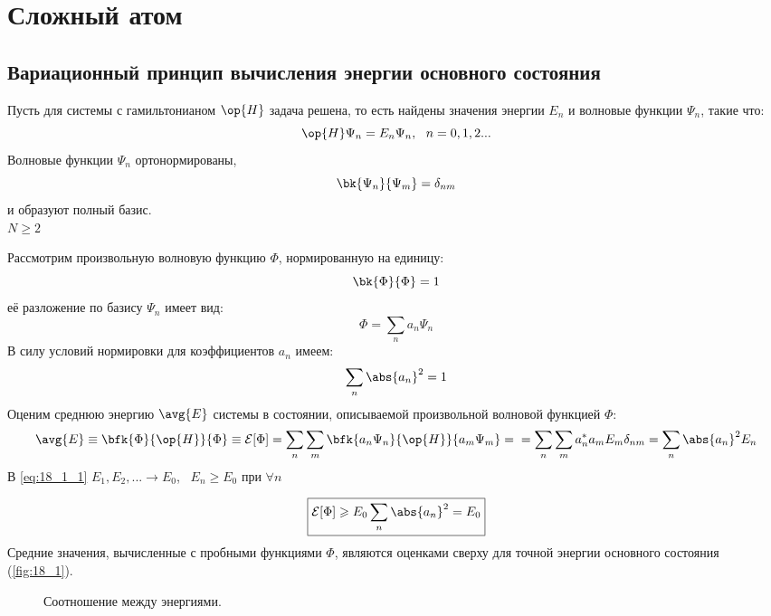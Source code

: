 \chapter{Сложный атом}

\section{Вариационный принцип вычисления энергии основного состояния}

Пусть для системы с гамильтонианом $\op{H}$ задача решена, то есть найдены значения энергии $E_n$ и волновые функции $\Psi_n$, такие что:
$$
\op{H}\Psi_n = E_n \Psi_n,~~ n = 0,1,2...
$$
Волновые функции $\Psi_n$ ортонормированы,
$$
\bk{\Psi_n}{\Psi_m} = \delta_{nm}
$$
и образуют полный базис.\\
$N \geqslant 2$

Рассмотрим произвольную волновую функцию $\Phi$, нормированную на единицу:
$$
\bk{\Phi}{\Phi} = 1
$$
её разложение по базису $\Psi_n$ имеет вид:
$$
\Phi = \sum_n a_n \Psi_n
$$
В силу условий нормировки для коэффициентов $a_n$ имеем:
$$
\sum_n \abs{a_n}^2 = 1
$$
Оценим среднюю энергию $\avg{E}$ системы в состоянии, описываемой произвольной волновой функцией $\Phi$:
\begin{equation}
\label{eq:18_1_1}
\avg{E} \equiv \bfk{\Phi}{\op{H}}{\Phi} \equiv \mathcal{E}[\Phi] = \sum_n \sum_m \bfk{a_n \Psi_n}{\op{H}}{a_m \Psi_m} = \\ = \sum_n \sum_m a_n^* a_m E_m \delta_{nm} = \sum_n \abs{a_n}^2 E_n
\end{equation}
В \eqref{eq:18_1_1} $E_1, E_2, ... \to E_0$,~ $E_n \geqslant E_0$ при $\forall n$

\begin{equation}
\label{eq:18_1_2}
\boxed{\mathcal{E}[\Phi] \geqslant E_0 \sum_n \abs{a_n}^2 = E_0}
\end{equation}
Средние значения, вычисленные с пробными функциями $\Phi$, являются оценками сверху для точной энергии основного состояния (\autoref{fig:18_1}).

\begin{figure}[h!]
\centering
{}
\caption{Соотношение между энергиями.} \label{fig:18_1}
\end{figure}


